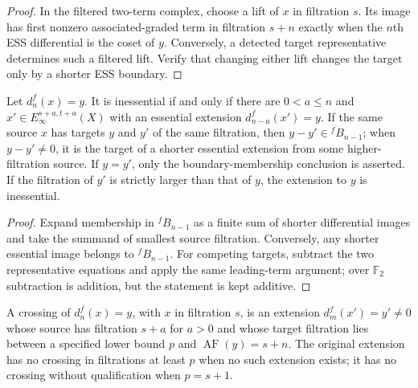 \begin{proof}
  In the filtered two-term complex, choose a lift of $x$ in filtration $s$.
  Its image has first nonzero associated-graded term in filtration $s+n$
  exactly when the $n$th ESS differential is the coset of $y$.  Conversely,
  a detected target representative determines such a filtered lift.  Verify
  that changing either lift changes the target only by a shorter ESS boundary.
\end{proof}

\begin{proposition}
  \label{prop:fextension-inessential-iff-higher}
  \notready
  Let $d_n^f(x)=y$.  It is inessential if and only if there are
  $0<a\le n$ and $x'\in E_\infty^{s+a,t+a}(X)$ with an essential extension
  $d_{n-a}^f(x')=y$.  If the same source $x$ has targets $y$ and $y'$ of the
  same filtration, then $y-y'\in{}^fB_{n-1}$; when $y-y'\ne0$, it is the
  target of a shorter essential extension from some higher-filtration source.
  If $y=y'$, only the boundary-membership conclusion is asserted.  If the
  filtration of $y'$ is strictly larger than that of $y$, the extension to
  $y$ is inessential.
\end{proposition}

\begin{proof}
  Expand membership in ${}^fB_{n-1}$ as a finite sum of shorter differential
  images and take the summand of smallest source filtration.  Conversely, any
  shorter essential image belongs to ${}^fB_{n-1}$.  For competing targets,
  subtract the two representative equations and apply the same leading-term
  argument; over $\mathbb F_2$ subtraction is addition, but the statement is
  kept additive.
\end{proof}

\begin{definition}
  \label{def:fess-crossing}
  \notready
  A crossing of $d_n^f(x)=y$, with $x$ in filtration $s$, is an extension
  $d_m^f(x')=y'\ne0$ whose source has filtration $s+a$ for $a>0$ and whose
  target filtration lies between a specified lower bound $p$ and
  $\operatorname{AF}(y)=s+n$.  The original extension has no crossing in
  filtrations at least $p$ when no such extension exists; it has no crossing
  without qualification when $p=s+1$.
\end{definition}

